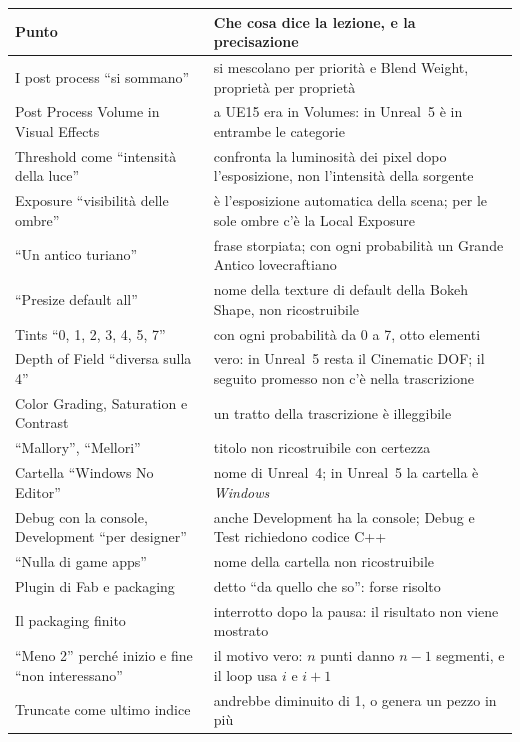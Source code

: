 \begin{table}[htbp]
\centering
\small
\begin{tabular}{@{}p{4.8cm}p{9.2cm}@{}}
\toprule
\textbf{Punto} & \textbf{Che cosa dice la lezione, e la precisazione} \\
\midrule
I post process ``si sommano'' & si mescolano per priorità e Blend Weight, proprietà per
proprietà \\
Post Process Volume in Visual Effects & a UE15 era in Volumes: in Unreal~5 è in entrambe le
categorie \\
Threshold come ``intensità della luce'' & confronta la luminosità dei pixel dopo
l'esposizione, non l'intensità della sorgente \\
Exposure ``visibilità delle ombre'' & è l'esposizione automatica della scena; per le sole
ombre c'è la Local Exposure \\
``Un antico turiano'' & frase storpiata; con ogni probabilità un Grande Antico lovecraftiano \\
``Presize default all'' & nome della texture di default della Bokeh Shape, non ricostruibile \\
Tints ``0, 1, 2, 3, 4, 5, 7'' & con ogni probabilità da 0 a 7, otto elementi \\
Depth of Field ``diversa sulla 4'' & vero: in Unreal~5 resta il Cinematic DOF; il seguito
promesso non c'è nella trascrizione \\
Color Grading, Saturation e Contrast & un tratto della trascrizione è illeggibile \\
``Mallory'', ``Mellori'' & titolo non ricostruibile con certezza \\
Cartella ``Windows No Editor'' & nome di Unreal~4; in Unreal~5 la cartella è \emph{Windows} \\
Debug con la console, Development ``per designer'' & anche Development ha la console; Debug e
Test richiedono codice C++ \\
``Nulla di game apps'' & nome della cartella non ricostruibile \\
Plugin di Fab e packaging & detto ``da quello che so'': forse risolto \\
Il packaging finito & interrotto dopo la pausa: il risultato non viene mostrato \\
``Meno 2'' perché inizio e fine ``non interessano'' & il motivo vero: $n$ punti danno $n-1$
segmenti, e il loop usa $i$ e $i+1$ \\
Truncate come ultimo indice & andrebbe diminuito di 1, o genera un pezzo in più \\

\end{tabular}
\end{table}
